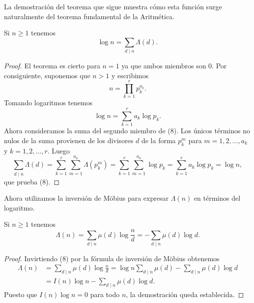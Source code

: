 \documentclass[12pt,a4paper]{book}
\begin{document}
    La demostración del teorema que sigue muestra cómo esta función surge naturalmente del
    teorema fundamental de la Aritmética.

    \begin{teorema}
        Si $n\geq1$ tenemos
        \begin{equation}
            \log n=\sum_{d\mid n}\Lambda(d).
        \end{equation}
    \end{teorema}

    \begin{proof}
        El teorema es cierto para $n=1$ ya que ambos miembros son 0. Por consiguiente,
        suponemos que $n>1$ y escribimos
        \begin{equation*}
            n=\prod_{k=1}^{r}p_{k}^{a_{k}}.
        \end{equation*}
        Tomando logaritmos tenemos
        \begin{equation*}
            \log n=\sum_{k=1}^{r}a_{k}\log p_{k}.
        \end{equation*}
        Ahora consideramos la suma del segundo miembro de (8). Los únicos términos no nulos
        de la suma provienen de los divisores $d$ de la forma $p_{k}^{m}$ para
        $m=1,2,\dots,a_{k}$ y $k=1,2,\dots,r$. Luego
        \begin{equation*}
            \sum_{d\mid n}\Lambda(d)=\sum_{k=1}^{r}\sum_{m=1}^{a_{k}}\Lambda(p_{k}^{m})
            =\sum_{k=1}^{r}\sum_{m=1}^{a_{k}}\log p_{k}=\sum_{k=1}^{r}a_{k}\log p_{k}=\log n,
        \end{equation*}
        que prueba (8).
    \end{proof}

    Ahora utilizamos la inversión de Möbius para expresar $\Lambda(n)$ en términos del
    logaritmo.

    \begin{teorema}
        Si $n\geq1$ tenemos
        \begin{equation*}
            \Lambda(n)=\sum_{d\mid n}\mu(d)\log\frac{n}{d}=-\sum_{d\mid n}\mu(d)\log d.
        \end{equation*}
    \end{teorema}

    \begin{proof}
        Invirtiendo (8) por la fórmula de inversión de Möbius obtenemos
        \begin{align*}
            \Lambda(n)&=\sum_{d\mid n}\mu(d)\log\frac{n}{d}
            =\log n\sum_{d\mid n}\mu(d)-\sum_{d\mid n}\mu(d)\log d\\
            &=I(n)\log n-\sum_{d\mid n}\mu(d)\log d.
        \end{align*}
        Puesto que $I(n)\log n=0$ para todo $n$, la demostración queda establecida.
    \end{proof}
\end{document}
